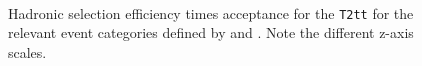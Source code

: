 \begin{figure}[!h]
  \begin{center}
     \\
    \caption{Hadronic selection efficiency times acceptance for the \texttt{T2tt}
      for the relevant event categories defined by \njet and \nb.
       Note the different z-axis scales.}
    \label{fig:sms-eff-t2_4body}
  \end{center}
\end{figure}

